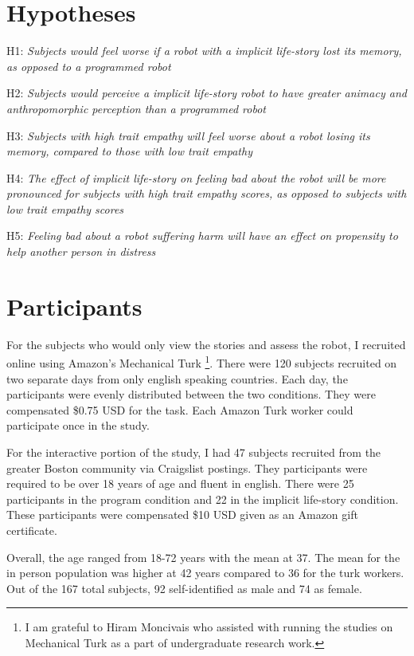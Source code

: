 \section{Hypotheses}

H1: \emph{Subjects would feel worse if a robot with a implicit life-story lost its memory, as opposed to a programmed robot }

H2: \emph{Subjects would perceive a implicit life-story robot to have greater animacy and anthropomorphic perception than a programmed robot}

H3: \emph{Subjects with high trait empathy will feel worse about a robot losing its memory, compared to those with low trait empathy}

H4: \emph{The effect of implicit life-story on feeling bad about the robot will be more pronounced for subjects with high trait empathy scores, as opposed to subjects with low trait empathy scores}

H5: \emph{Feeling bad about a robot suffering harm will have an effect on propensity to help another person in distress}

\section{Participants}

For the subjects who would only view the stories and assess the robot, I recruited online using Amazon's Mechanical Turk \footnote{I am grateful to Hiram Moncivais who assisted with running the studies on Mechanical Turk as a part of undergraduate research work.}. There were 120 subjects recruited on two separate days from only english speaking countries. Each day, the participants were evenly distributed between the two conditions.  They were compensated \$0.75 USD for the task. Each Amazon Turk worker could participate once in the study. 

For the interactive portion of the study, I had 47 subjects recruited from the greater Boston community via Craigslist postings. They participants were required to be over 18 years of age and fluent in english. There were 25 participants in the program condition and 22 in the implicit life-story condition. These participants were compensated \$10 USD given as an Amazon gift certificate. 

Overall, the age ranged from 18-72 years with the mean at 37. The mean for the in person population was higher at 42 years compared to 36 for the turk workers. Out of the 167 total subjects, 92 self-identified as male and 74 as female. 

